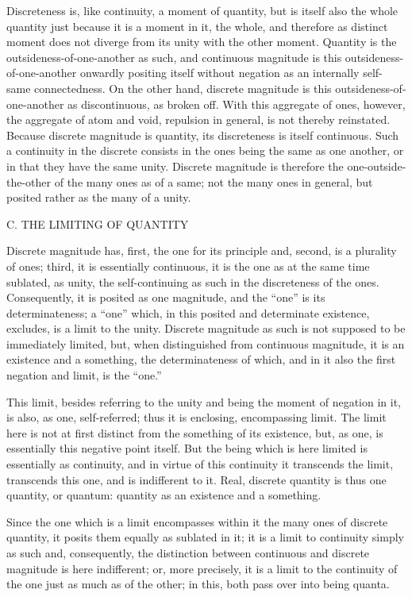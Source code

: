 Discreteness is, like continuity, a moment of quantity,
but is itself also the whole quantity
just because it is a moment in it, the whole,
and therefore as distinct moment does not
diverge from its unity with the other moment.
Quantity is the outsideness-of-one-another as such,
and continuous magnitude is this outsideness-of-one-another
onwardly positing itself without negation
as an internally self-same connectedness.
On the other hand, discrete magnitude is this
outsideness-of-one-another as discontinuous, as broken off.
With this aggregate of ones, however,
the aggregate of atom and void,
repulsion in general, is not thereby reinstated.
Because discrete magnitude is quantity,
its discreteness is itself continuous.
Such a continuity in the discrete consists
in the ones being the same as one another,
or in that they have the same unity.
Discrete magnitude is therefore
the one-outside-the-other of
the many ones as of a same;
not the many ones in general,
but posited rather as the many of a unity.

C. THE LIMITING OF QUANTITY

Discrete magnitude has,
first, the one for its principle
and, second, is a plurality of ones;
third, it is essentially continuous,
it is the one as at the same time
sublated, as unity,
the self-continuing as such
in the discreteness of the ones.
Consequently, it is posited as one magnitude,
and the “one” is its determinateness;
a “one” which, in this posited and determinate existence,
excludes, is a limit to the unity.
Discrete magnitude as such is not supposed
to be immediately limited,
but, when distinguished from continuous magnitude,
it is an existence and a something,
the determinateness of which,
and in it also the first negation and limit,
is the “one.”

This limit, besides referring to the unity
and being the moment of negation in it,
is also, as one, self-referred;
thus it is enclosing, encompassing limit.
The limit here is not at first distinct
from the something of its existence,
but, as one, is essentially this negative point itself.
But the being which is here limited is essentially as continuity,
and in virtue of this continuity it transcends the limit,
transcends this one, and is indifferent to it.
Real, discrete quantity is thus one quantity, or quantum:
quantity as an existence and a something.

Since the one which is a limit encompasses
within it the many ones of discrete quantity,
it posits them equally as sublated in it;
it is a limit to continuity simply as such
and, consequently, the distinction between
continuous and discrete magnitude is here indifferent;
or, more precisely, it is a limit to
the continuity of the one
just as much as of the other;
in this, both pass over into being quanta.

